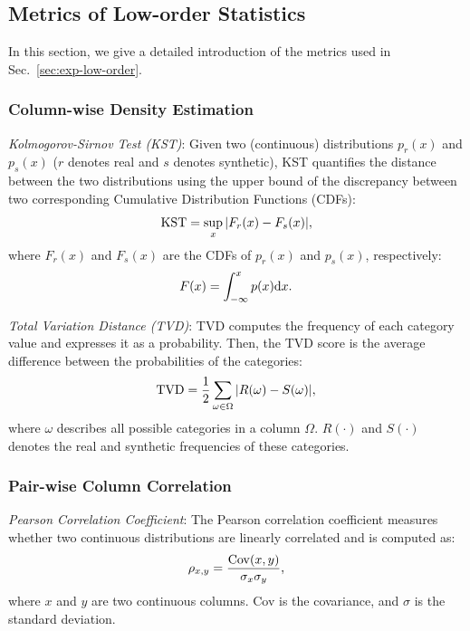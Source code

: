 \subsection{Metrics of Low-order Statistics}\label{appendix:metric}
In this section, we give a detailed introduction of the metrics used in Sec.~\ref{sec:exp-low-order}.
\subsubsection{Column-wise Density Estimation}

\textit{Kolmogorov-Sirnov Test (KST)}: Given two (continuous) distributions $p_r(x)$ and $p_s(x)$ ($r$ denotes real and $s$ denotes synthetic), KST quantifies the distance between the two distributions using the upper bound of the discrepancy between two corresponding Cumulative Distribution Functions (CDFs):
\begin{equation}
    {\rm KST} = \sup\limits_{x}  | F_r(x) - F_s(x) |,
\end{equation}
where $F_r(x)$ and $F_s(x)$ are the CDFs of $p_r(x)$ and $p_s(x)$, respectively:
\begin{equation}
    F(x) = \int_{-\infty}^x p(x) {\rm d} x.
\end{equation}

\textit{Total Variation Distance (TVD)}: TVD computes the frequency of each category value and expresses it as a probability. Then, the TVD score is the average difference between the probabilities of the categories:
\begin{equation}
    {\rm TVD} = \frac{1}{2} \sum\limits_{\omega \in \Omega} |R(\omega) - S(\omega)|,
\end{equation}
where $\omega$ describes all possible categories in a column $\Omega$. $R(\cdot)$ and $S(\cdot)$ denotes the real and synthetic frequencies of these categories.

\subsubsection{Pair-wise Column Correlation}

\textit{Pearson Correlation Coefficient}: The Pearson correlation coefficient measures whether two continuous distributions are linearly correlated and is computed as:
\begin{equation}
    \rho_{x, y}  = \frac{ {\rm Cov} (x, y)}{\sigma_x \sigma_y},
\end{equation}
where $x$ and $y$ are two continuous columns. Cov is the covariance, and $\sigma$ is the standard deviation. 


